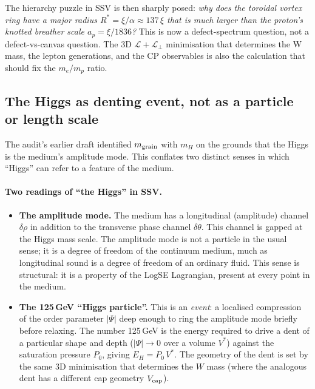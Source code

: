 \documentclass[11pt,a4paper]{article}
\begin{document}
The hierarchy puzzle in SSV is then sharply posed: \emph{why does
the toroidal vortex ring have a major radius
$R^* = \xi/\alpha \approx 137\,\xi$ that is much larger than the
proton's knotted breather scale $a_p = \xi/1836$?}  This is now a
defect-spectrum question, not a defect-vs-canvas question.  The 3D
$\mathcal{L}+\mathcal{L}_\perp$ minimisation that determines the W
mass, the lepton generations, and the CP observables is also the
calculation that should fix the $m_e/m_p$ ratio.

\subsection{The Higgs as denting event, not as a particle or length scale}
\label{sec:higgs_event}

The audit's earlier draft identified $m_{\rm grain}$ with $m_H$ on the
grounds that the Higgs is the medium's amplitude mode.  This conflates
two distinct senses in which ``Higgs'' can refer to a feature of the
medium.

\paragraph{Two readings of ``the Higgs'' in SSV.}
\begin{itemize}
    \item \textbf{The amplitude mode.}  The medium has a longitudinal
          (amplitude) channel $\delta\rho$ in addition to the
          transverse phase channel $\delta\theta$.  This channel is
          gapped at the Higgs mass scale.  The amplitude mode is not a
          particle in the usual sense; it is a degree of freedom of the
          continuum medium, much as longitudinal sound is a degree of
          freedom of an ordinary fluid.  This sense is structural: it
          is a property of the LogSE Lagrangian, present at every point
          in the medium.
    \item \textbf{The 125\,GeV ``Higgs particle''.}  This is an
          \emph{event}: a localised compression of the order parameter
          $|\Psi|$ deep enough to ring the amplitude mode briefly
          before relaxing.  The number 125\,GeV is the energy required
          to drive a dent of a particular shape and depth ($|\Psi|\to 0$
          over a volume $V^*$) against the saturation pressure $P_0$,
          giving $E_H = P_0\,V^*$.  The geometry of the dent is set by
          the same 3D minimisation that determines the $W$ mass (where
          the analogous dent has a different cap geometry $V_{\rm cap}$).
\end{itemize}
\end{document}
